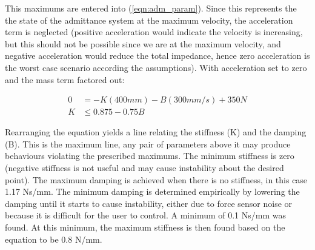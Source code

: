 \documentclass[12pt]{report}
\begin{document}
	This maximums are entered into (\ref{eqn:adm_param}). Since this represents the the state of the admittance system at the maximum velocity, the acceleration term is neglected (positive acceleration would indicate the velocity is increasing, but this should not be possible since we are at the maximum velocity, and negative acceleration would reduce the total impedance, hence zero acceleration is the worst case scenario according the assumptions). With acceleration set to zero and the mass term factored out:
	
	\begin{align}
		0 &= -K(400mm) - B(300mm/s) + 350N \\
		K &\leq 0.875 - 0.75B  
	\end{align}
	
	Rearranging the equation yields a line relating the stiffness (K) and the damping (B). This is the maximum line, any pair of parameters above it may produce behaviours violating the prescribed maximums. The minimum stiffness is zero (negative stiffness is not useful and may cause instability about the desired point). The maximum damping is achieved when there is no stiffness, in this case 1.17 Ns/mm. The minimum damping is determined empirically by lowering the damping until it starts to cause instability, either due to force sensor noise or because it is difficult for the user to control. A minimum of 0.1 Ns/mm was found. At this minimum, the maximum stiffness is then found based on the equation to be 0.8 N/mm. 
	

	
\end{document}
